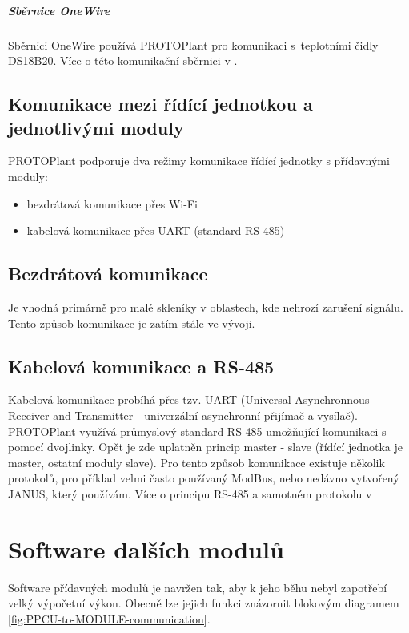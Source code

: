 \paragraph{Sběrnice OneWire}
Sběrnici OneWire používá PROTOPlant pro komunikaci s~teplotními čidly DS18B20. 
Více o této komunikační sběrnici v \cite{DS18B20}.

\section{Komunikace mezi řídící jednotkou a jednotlivými moduly}
PROTOPlant podporuje dva režimy komunikace řídící jednotky s přídavnými moduly:
\begin{itemize}
    \item bezdrátová komunikace přes Wi-Fi
    \item kabelová komunikace přes UART (standard RS-485)
\end{itemize}

\section{Bezdrátová komunikace}
Je vhodná primárně pro malé skleníky v oblastech, kde nehrozí zarušení signálu.
Tento způsob komunikace je zatím stále ve vývoji.

\section{Kabelová komunikace a RS-485}
Kabelová komunikace probíhá přes tzv. UART (Universal Asynchronnous Receiver and Transmitter - univerzální asynchronní přijímač a vysílač).
PROTOPlant využívá průmyslový standard RS-485 umožňující komunikaci s pomocí dvojlinky.
Opět je zde uplatněn princip master - slave (řídící jednotka je master, ostatní moduly slave).
Pro tento způsob komunikace existuje několik protokolů, pro příklad velmi často používaný ModBus, nebo nedávno vytvořený JANUS\cite{JANUS}, který používám. 
Více o principu RS-485 a samotném protokolu v \cite[21-25]{JANUS}

\chapter{Software dalších modulů}
\label{chap:moduleSoftware}
Software přídavných modulů je navržen tak, aby k jeho běhu nebyl zapotřebí velký výpočetní výkon.
Obecně lze jejich funkci znázornit blokovým diagramem \ref{fig:PPCU-to-MODULE-communication}.

